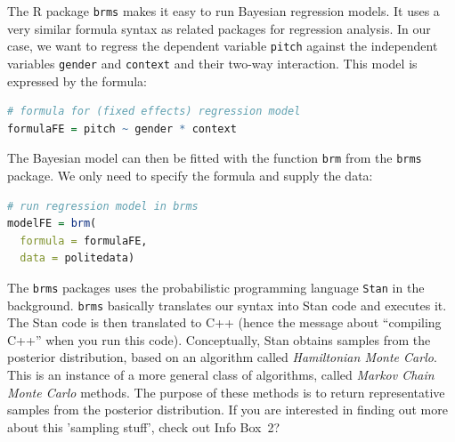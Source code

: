 \documentclass[nobib]{tufte-handout}
\begin{document}
The R package \texttt{brms} \citep{buerkner2016brms} makes it easy to run Bayesian regression models. It uses a very similar formula syntax as related packages for regression analysis. In our case, we want to regress the dependent variable \texttt{pitch} against the independent variables \texttt{gender} and \texttt{context} and their two-way interaction. This model is expressed by the formula:

\bigskip

\begin{minipage}[]{\textwidth}
\begin{lstlisting}[language=R]
# formula for (fixed effects) regression model
formulaFE = pitch ~ gender * context
\end{lstlisting}
\end{minipage}

The Bayesian model can then be fitted with the function \texttt{brm} from the \texttt{brms} package. We only need to specify the formula and supply the data:

\bigskip

\begin{minipage}[]{\textwidth}
\begin{lstlisting}[language=R]
# run regression model in brms
modelFE = brm(
  formula = formulaFE,
  data = politedata)
\end{lstlisting}
\end{minipage}

\noindent The \texttt{brms} packages uses the probabilistic programming language \texttt{Stan}
in the background. \texttt{brms} basically translates our syntax into Stan code and
executes it. The Stan code  is then translated to C++ (hence the message about ``compiling
C++'' when you run this code). Conceptually, Stan obtains samples from the posterior
distribution, based on an algorithm called \emph{Hamiltonian Monte Carlo}. This is an instance
of a more general class of algorithms, called \emph{Markov Chain Monte Carlo} methods. The
purpose of these methods is to return representative samples from the posterior distribution.
If you are interested in finding out more about this 'sampling stuff', check out Info Box~2?
\end{document}
